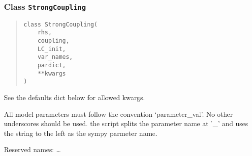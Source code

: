 \documentclass[english,a4paper,oneside]{article}
\begin{document}
\hypertarget{StrongCoupling.StrongCoupling}{%
\subsubsection{\texorpdfstring{Class
\texttt{StrongCoupling}}{Class StrongCoupling}}\label{StrongCoupling.StrongCoupling}}

\begin{quote}
\begin{verbatim}
class StrongCoupling(
    rhs,
    coupling,
    LC_init,
    var_names,
    pardict,
    **kwargs
)
\end{verbatim}
\end{quote}

See the defaults dict below for allowed kwargs.

All model parameters must follow the convention `parameter\_val'. No
other underscores should be used. the script splits the parameter name
at '\_' and uses the string to the left as the sympy parmeter name.

Reserved names: \ldots{}
\end{document}
